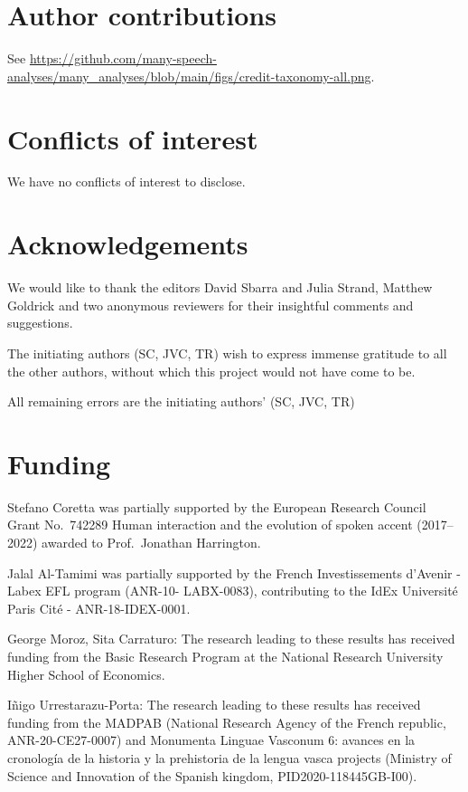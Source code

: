 \documentclass[Review,times,sageh]{sagej}
\begin{document}
\hypertarget{author-contributions}{%
\section{Author contributions}\label{author-contributions}}

See \url{https://github.com/many-speech-analyses/many_analyses/blob/main/figs/credit-taxonomy-all.png}.

\hypertarget{conflicts-of-interest}{%
\section{Conflicts of interest}\label{conflicts-of-interest}}

We have no conflicts of interest to disclose.

\hypertarget{acknowledgements}{%
\section{Acknowledgements}\label{acknowledgements}}

We would like to thank the editors David Sbarra and Julia Strand, Matthew Goldrick and two anonymous reviewers for their insightful comments and suggestions.

The initiating authors (SC, JVC, TR) wish to express immense gratitude to all the other authors, without which this project would not have come to be.

All remaining errors are the initiating authors' (SC, JVC, TR)

\hypertarget{funding}{%
\section{Funding}\label{funding}}

Stefano Coretta was partially supported by the European Research Council Grant No.~742289 Human interaction and the evolution of spoken accent (2017--2022) awarded to Prof.~Jonathan Harrington.

Jalal Al-Tamimi was partially supported by the French Investissements d'Avenir - Labex EFL program (ANR-10- LABX-0083), contributing to the IdEx Université Paris Cité - ANR-18-IDEX-0001.

George Moroz, Sita Carraturo: The research leading to these results has received funding from the Basic Research Program at the National Research University Higher School of Economics.

Iñigo Urrestarazu-Porta: The research leading to these results has received funding from the MADPAB (National Research Agency of the French republic, ANR-20-CE27-0007) and Monumenta Linguae Vasconum 6: avances en la cronología de la historia y la prehistoria de la lengua vasca projects (Ministry of Science and Innovation of the Spanish kingdom, PID2020-118445GB-I00).
\end{document}
